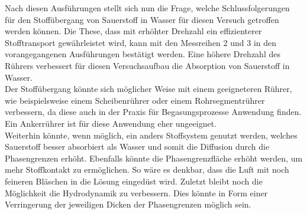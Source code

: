 Nach diesen Ausführungen stellt sich nun die Frage, welche Schlussfolgerungen für den Stoffübergang von Sauerstoff in Wasser für diesen Versuch getroffen werden können.
Die These, dass mit erhöhter Drehzahl ein effizienterer Stofftransport gewährleistet wird, kann mit den Messreihen 2 und 3 in den vorangegangenen Ausführungen bestätigt werden. Eine höhere Drehzahl des Rührers verbessert für diesen Versuchsaufbau die Absorption von Sauerstoff in Wasser. \\
Der Stoffübergang könnte sich möglicher Weise mit einem geeigneteren Rührer, wie beispielsweise einem Scheibenrührer oder einem Rohrsegmentrührer verbessern, da diese auch in der Praxis für Begasungsprozesse Anwendung finden. Ein Ankerrührer ist für diese Anwendung eher ungeeignet.\\
Weiterhin könnte, wenn möglich, ein anders Stoffsystem genutzt werden, welches Sauerstoff besser absorbiert als Wasser und somit die Diffusion durch die Phasengrenzen erhöht. Ebenfalls könnte die Phasengrenzfläche erhöht werden, um mehr Stoffkontakt zu ermöglichen. So wäre es denkbar, dass die Luft mit noch feineren Bläschen in die Lösung eingedüst wird. Zuletzt bleibt noch die Möglichkeit die Hydrodynamik zu verbessern. Dies könnte in Form einer Verringerung der jeweiligen Dicken der  Phasengrenzen möglich sein.
